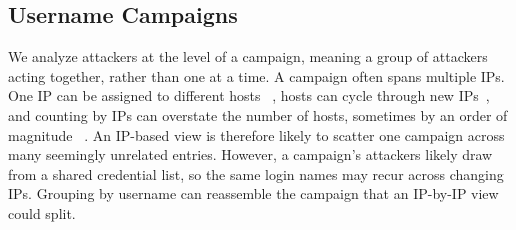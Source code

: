 \documentclass[conference]{IEEEtran}
\begin{document}
\subsection{Username Campaigns}

We analyze attackers at the level of a campaign, meaning a group of attackers acting together, rather than one at a time. A campaign often spans multiple IPs. 
One IP can be assigned to different hosts ~\cite{xie2007dynamic}, hosts can 
cycle through new IPs~\cite{stone2009your}, and counting by IPs can overstate the number of hosts, sometimes 
by an order of magnitude ~\cite{moura2015dynamic}. An IP-based view is therefore 
likely to scatter one campaign across many seemingly unrelated entries. However, a campaign’s attackers likely draw from a shared credential list, so the same login names 
may recur across changing IPs. Grouping by username can reassemble the campaign that an IP-by-IP view could split.
\end{document}
